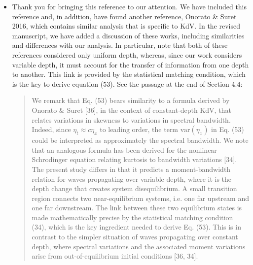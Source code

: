 \documentclass[11pt]{article}
\begin{document}
\begin{itemize}
\item Thank you for bringing this reference to our attention. We have included this reference and, in addition, have found another reference, Onorato \& Suret 2016, which contains similar analysis that is specific to KdV. In the revised manuscript, we have added a discussion of these works, including similarities and differences with our analysis. In particular, note that both of these references considered only uniform depth, whereas, since our work considers variable depth, it must account for the transfer of information from one depth to another. This link is provided by the statistical matching condition, which is the key to derive equation (53). See the passage at the end of Section 4.4:

\begin{quotation}
We remark that Eq. (53) bears similarity to a formula derived by Onorato \& Suret [36], in the context of constant-depth KdV, that relates variations in skewness to variations in spectral bandwidth. Indeed, since $\eta_t \approx c \eta_x$ to leading order, the term $\text{var}(\eta_x)$ in Eq. (53) could be interpreted as approximately the spectral bandwidth. We note that an analogous formula has been derived for the nonlinear Schrodinger equation relating kurtosis to bandwidth variations [34]. The present study differs in that it predicts a moment-bandwidth relation for waves propagating over variable depth, where it is the depth change that creates system disequilibrium. A small transition region connects two near-equilibrium systems, i.e. one far upstream and one far downstream. The link between these two equilibrium states is made mathematically precise by the statistical matching condition (34), which is the key ingredient needed to derive Eq. (53). This is in contrast to the simpler situation of waves propagating over constant depth, where spectral variations and the associated moment variations arise from out-of-equilibrium initial conditions [36, 34].
\end{quotation}

\end{itemize}
\end{document}
